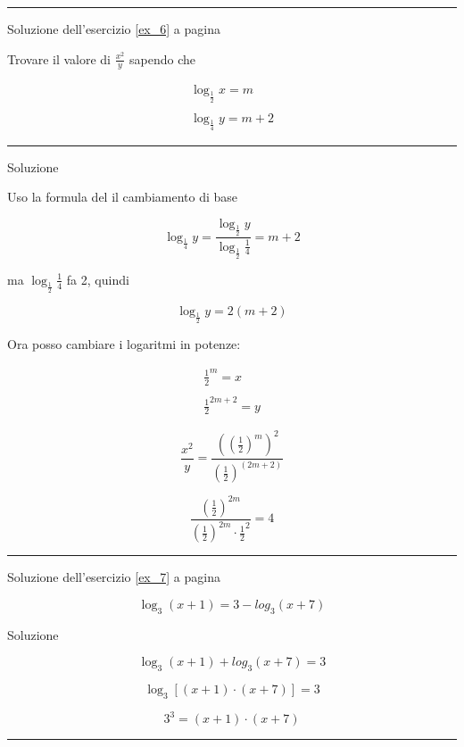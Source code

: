 \vspace{1cm}
\hrule
\vspace{1cm}
Soluzione dell'esercizio \ref{ex_6} a pagina \pageref{ex_6}\label{sol_6}

Trovare il valore di $\frac{x^2}{y}$ sapendo che 

\[
\begin{split}
\log_{\frac{1}{2}}x=m \\
\\
\log_{\frac{1}{4}}y=m+2
\end{split}
\]

\vspace{1cm}
\hrule
\vspace{1cm}

Soluzione

Uso la formula del il cambiamento di base

\[
\log_{\frac{1}{4}}y=\frac{
\log_{\frac{1}{2}}y
}{
\log_{\frac{1}{2}}\frac{1}{4}
}=m+2
\]

ma $\log_{\frac{1}{2}}\frac{1}{4}$ fa 2, quindi

\[
\log_\frac{1}{2}y=2(m+2)
\]

Ora posso cambiare i logaritmi in potenze:

\[
\begin{split}
\frac{1}{2}^m=x \\
\\
\frac{1}{2}^{2m+2}=y
\end{split}
\]

\[
\frac{x^2}{y}=
\frac{
\left( \left( \frac{1}{2} \right)^m \right)^2
}{
\left( \frac{1}{2} \right) ^{(2m+2)}
}
\]

\[
\frac{
\left( \frac{1}{2} \right)^{2m}
}{
\left( \frac{1}{2} \right) ^{2m} \cdot
\frac{1}{2}^2
}=4
\]

\vspace{1cm}
\hrule
\vspace{1cm}



Soluzione dell'esercizio \ref{ex_7} a pagina \pageref{ex_7}\label{sol_7}

\[
\log_3(x+1)=3-log_3(x+7)
\]

Soluzione

\[
\log_3(x+1)+log_3(x+7)=3
\]

\[
\log_3[(x+1) \cdot (x+7)]=3
\]

\[
3^3=(x+1) \cdot (x+7)
\]



\vspace{1cm}
\hrule
\vspace{1cm}


